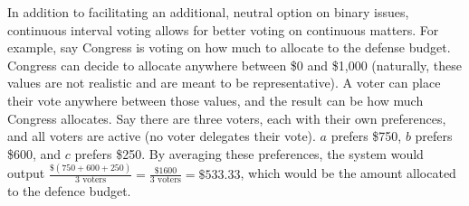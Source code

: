 In addition to facilitating an additional, neutral option on binary issues,
continuous interval voting allows for better voting on continuous matters.
For example, say Congress is voting on how much to allocate to the defense budget.
Congress can decide to allocate anywhere between \$0 and \$1,000 (naturally, these
values are not realistic and are meant to be representative).
A voter can place their vote anywhere between those values, and the result can be how
much Congress allocates.
Say there are three voters, each with their own preferences, and all voters are
active (no voter delegates their vote).
$a$ prefers \$750, $b$ prefers \$600, and $c$ prefers \$250.
By averaging these preferences, the system would output
$\frac{\$(750 + 600 + 250)}{3 \text{ voters}} = \frac{\$1600}{3 \text{ voters}} =
\$533.33$, which would be the amount allocated to the defence budget.

